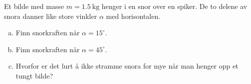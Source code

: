 %
Et bilde med masse $m = \SI{1.5}{\kilo\gram}$ henger i en snor over en spiker. De to delene av snora danner like store vinkler $\alpha$ med horisontalen.
\begin{enumerate}[a)]
    \item Finn snorkraften når $\alpha = 15^\circ$.
    \item Finn snorkraften når $\alpha = 45^\circ$.
    \item Hvorfor er det lurt å ikke stramme snora for mye når man henger opp et tungt bilde?
\end{enumerate}

